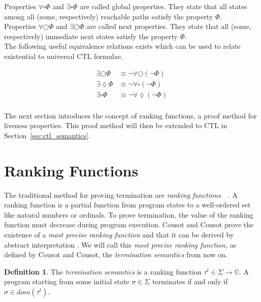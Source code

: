 \documentclass[11pt,a4paper,titlepage]{article}
\theoremstyle{definition}
\newtheorem{definition}{Definition}[section]
\begin{document}
Properties $\forall\square\Phi$ and $\exists\square\Phi$ are called \textsf{global} properties. They state that all states among 
all (some, respectively) reachable paths satisfy the property $\Phi$.\\

Properties $\forall\bigcirc\Phi$ and $\exists\bigcirc\Phi$ are called \textsf{next} properties. They state that all (some, respectively) immediate next
states satisfy the property $\Phi$.\\

The following useful equivalence relations 
exists which can be used to relate existential to universal CTL formulae.

\begin{align*}
    \exists\bigcirc\Phi &\equiv \neg \forall\bigcirc(\neg \Phi)\\ 
    \exists\lozenge\Phi &\equiv \neg \forall\square(\neg \Phi) \\
    \exists\square\Phi  &\equiv \neg \forall\lozenge(\neg \Phi) \\
\end{align*}

The next section introduces the concept of ranking functions, a proof method for liveness properties. 
This proof method will then be extended to CTL in Section~\ref{sec:ctl_semantics}. 

\section{Ranking Functions}\label{sec:ranking_functions}

The traditional method for proving termination are \textit{ranking functions}~\cite{Touring49}~\cite{Floyd67}.
A ranking function is a partial function from program states to a well-ordered set like natural numbers or ordinals. 
To prove termination, the value of the ranking function must decrease during program execution. 
Cousot and Cousot prove the existence of a \textit{most precise ranking function} and that it can be derived 
by abstract interpretation \cite{CousotCousot-POPL12}. 
We will call this \textit{most precise ranking function}, as defined by Cousot and Cousot, 
the \textit{termination semantics} from now on.

\begin{definition}
    The \textit{termination semantics} is a ranking function 
    $\tau^{t} \in \Sigma \rightarrow \mathbb{O}$.
    A program starting from some initial state $\sigma \in \Sigma$ terminates if and only if $\sigma \in dom(\tau^{t})$.
\end{definition}
\end{document}

